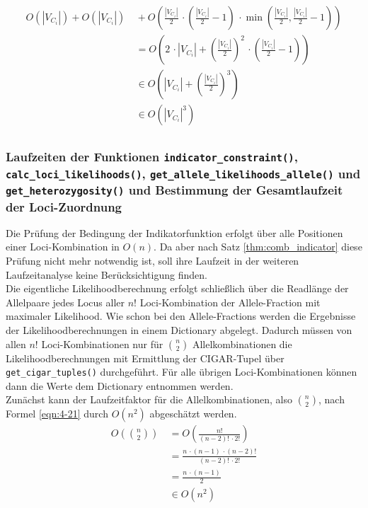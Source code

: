 \begin{equation} \label{eqn:4-20}
\tag{4-20}
\begin{aligned}
 O(|V_{C_{i}}|) + O(|V_{C_{i}}|) &\ {} + O\left( \frac{|V_{C_{i}}|}{2} \, \cdotp \left( \frac{|V_{C_{i}}|}{2} - 1\right) \, \cdotp \min \left(\frac{|V_{C_{i}}|}{2}, \frac{|V_{C_{i}}|}{2} -1 \right)   \right)   \\
& \ = O\left(2  \, \cdotp |V_{C_{i}}| +  \left( \frac{|V_{C_{i}}|}{2}\right)^2 \, \cdotp \left( \frac{|V_{C_{i}}|}{2} - 1\right) \right) \\
&\ \in O\left(|V_{C_{i}}| + \left( \frac{|V_{C_{i}}|}{2}\right)^3 \right)  \\
&\ \in O(|V_{C_{i}}|^3) \\
\end{aligned}
\end{equation}

\subsubsection{Laufzeiten der Funktionen \lstinline|indicator_constraint()|, \lstinline|calc_loci_likelihoods()|, \linebreak \lstinline|get_allele_likelihoods_allele()| und \lstinline|get_heterozygosity()| und Bestimmung der Gesamtlaufzeit der Loci-Zuordnung} \label{subsubsec:compl_loci_lh}

Die Prüfung der Bedingung der Indikatorfunktion erfolgt über alle Positionen einer Loci-Kombination in $O(n)$. Da aber nach Satz \ref{thm:comb_indicator} diese Prüfung nicht mehr notwendig ist, soll ihre Laufzeit in der weiteren Laufzeitanalyse keine Berücksichtigung finden. \\

Die eigentliche Likelihoodberechnung erfolgt schließlich über die Readlänge der Allelpaare jedes Locus aller $n!$ Loci-Kombination der Allele-Fraction mit maximaler Likelihood. Wie schon bei den Allele-Fractions werden die Ergebnisse der Likelihoodberechnungen in einem Dictionary abgelegt. Dadurch müssen von allen $n!$ Loci-Kombinationen nur für $\binom{n}{2}$ Allelkombinationen die Likelihoodberechnungen mit Ermittlung der CIGAR-Tupel über \lstinline|get_cigar_tuples()| durchgeführt. Für alle übrigen Loci-Kombinationen können dann die Werte dem Dictionary entnommen werden. \\

Zunächst kann der Laufzeitfaktor für die Allelkombinationen, also $\binom{n}{2}$, nach Formel \eqref{eqn:4-21} durch $O(n^2)$ abgeschätzt werden.
\begin{equation} \label{eqn:4-21}
\tag{4-21}
\begin{aligned}
 O\left( \binom{n}{2}\right) &\ {} = O\left( \frac{n!}{(n - 2)!\, \cdotp 2! }\right) \\
&\ = \frac{n \, \cdotp (n - 1) \, \cdotp (n - 2)!}{(n - 2)!\, \cdotp 2!} \\
&\ = \frac{n \, \cdotp (n - 1)}{2} \\
&\ \in O(n^2)
\end{aligned}
\end{equation}

